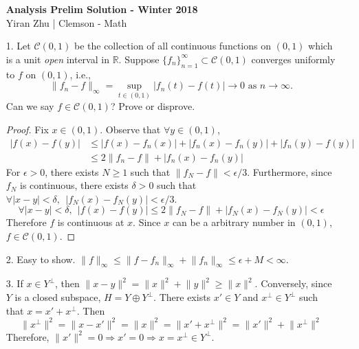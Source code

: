 


\begin{itemize}
		\begin{center}
			\Large{\textbf{Analysis Prelim Solution - Winter 2018}}
			\normalsize{\\Yiran Zhu | Clemson - Math}
		\end{center}
		\item[1.] Let $\mathcal{C}(0, 1)$ be the collection of all continuous functions on $(0, 1)$ which is a unit \textit{open} interval in $\mathbb{R}$. Suppose $\{f_n\}_{n=1}^\infty \subset \mathcal{C}(0, 1)$ converges uniformly to $f$ on $(0, 1)$, i.e.,
		$$\lVert f_n -f\rVert_\infty = \sup_{t\in (0,1)} |f_n(t)-f(t)| \rightarrow 0 \text{ as } n \rightarrow \infty.
		$$
		Can we say $f \in \mathcal{C}(0, 1)$? Prove or disprove.

		\begin{proof}
			Fix $x\in (0,1)$. Observe that $\forall y\in (0,1)$, 
			$$
			\begin{aligned}
			\lvert f(x) - f(y) \rvert &\le  \lvert f(x) - f_n(x) \rvert + \lvert f_n(x) - f_n(y) \rvert + \lvert f_n(y) - f(y)\rvert\\
			&\le 2\lVert f_n- f\rVert +  \lvert f_n(x) - f_n(y) \rvert 
			\end{aligned}
			$$
			For $\epsilon >0$, there exists $N\ge 1$ such that $\lVert f_N-f\rVert < \epsilon/3$. Furthermore, since $f_N$ is continuous, there exists $\delta >0$ such that $\forall \lvert x-y\rvert < \delta, ~~|f_N(x) - f_N(y)|<\epsilon/3$.
			$$
			\forall |x-y|< \delta, ~~\lvert f(x) - f(y) \rvert \le 2\lVert f_N- f\rVert +  \lvert f_N(x) - f_N(y) \rvert  < \epsilon
			$$
			Therefore $f$ is continuous at $x$. Since $x$ can be a arbitrary number in $(0,1)$, $f \in \mathcal{C}(0,1)$.
		\end{proof}
		
		\item[2.] Easy to show. $\lVert f\rVert_\infty \le \lVert f-f_n\rVert_\infty + \lVert f_n\rVert_\infty \le \epsilon + M < \infty$.
		
		\item[3.] If $x\in Y^\perp$, then $\lVert x-y\rVert^2 = \lVert x\rVert^2 +  \lVert y\rVert^2 \ge \lVert x\rVert^2$. Conversely, since $Y$ is a closed subspace, $H= Y\oplus Y^\perp$. There exists $x' \in Y$ and $x^\perp \in Y^\perp$ such that $x = x'+x^\perp$. Then 
		$$
		\lVert x^\perp \rVert^2=\lVert x - x'\rVert^2 = \lVert x\rVert^2 = \lVert  x'+x^\perp\rVert^2 =  \lVert x'\rVert^2+\lVert x^\perp\rVert^2
		$$
		Therefore, $\lVert x'\rVert^2 = 0 \Rightarrow x' = 0 \Rightarrow x= x^\perp \in Y^\perp$.
		

\end{itemize}
